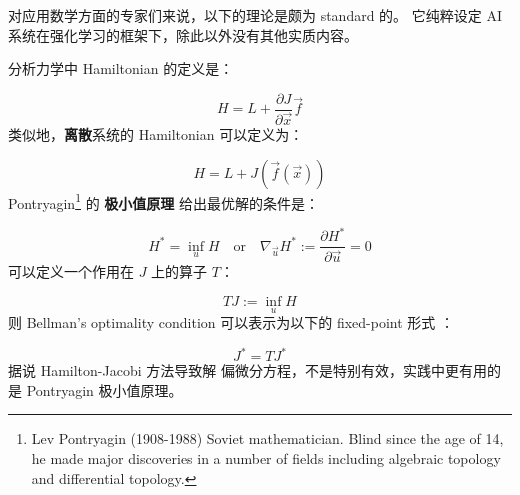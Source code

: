 \documentclass[12pt, orivec]{article}
\newcommand{\cc}[2]{#1}
\newcommand{\cc}[2]{#2}
\begin{document}
\cc{对应用数学方面的专家们来说，以下的理论是颇为 standard 的。  它纯粹设定 AI 系统在强化学习的框架下，除此以外没有其他实质内容。 

分析力学中 Hamiltonian 的定义是：
}{
For experts in applied mathematics, the following theory is quite standard.  It merely sets up the AI system under the framework of reinforcement learning, which otherwise has no substantial content.

The definition of Hamiltonian in analytical mechanics is:}
\begin{equation}
H = L + \frac{\partial J}{\partial \vec{x}} \vec{f}
\end{equation}
\cc{类似地，\textbf{离散}系统的 Hamiltonian 可以定义为：
}{
Similarly, the Hamiltonian of the \textbf{discrete} system can be defined as:}
\begin{equation}
H = L + J ( \vec{f}(\vec{x}) )
\end{equation}
\cc{Pontryagin\footnote{Lev Pontryagin (1908-1988) Soviet mathematician. Blind since the age of 14, he made major discoveries in a number of fields including algebraic topology and differential topology.} 的 \textbf{极小值原理} 给出最优解的条件是：
}{
Pontryagin\footnote{Lev Pontryagin (1908-1988) Soviet mathematician. Blind since the age of 14, he made major discoveries in a number of fields including algebraic topology and differential topology.} 's \textbf{maximum principle} gives the condition for the optimal solution:}
\begin{equation}
\label{Pontryagin-max-principle}
H^* = \inf_u H \quad \mbox{or} \quad \nabla_{\vec{u}} H^* := \frac{\partial H^*}{\partial \vec{u}} = 0
\end{equation}
\cc{可以定义一个作用在 $J$ 上的算子 $T$：
}{
We can define an operator $T$ that acts on $J$:}
\begin{equation}
T J := \inf_u H
\end{equation}
\cc{则 Bellman's optimality condition 可以表示为以下的 fixed-point 形式 \parencite{Bertsekas2013}：
}{
Then Bellman's optimality condition can be expressed as the following fixed-point equation \parencite{Bertsekas2013}:}
\begin{equation}
J^* = T J^*
\end{equation}
\cc{据说 Hamilton-Jacobi 方法导致解 偏微分方程，不是特别有效，实践中更有用的是 Pontryagin 极小值原理。
}{
It is said that the Hamilton-Jacobi method leads to the solving of partial differential equations, which is not particularly efficient.  In practice, the Pontryagin minimum principle is more useful.}
\end{document}
